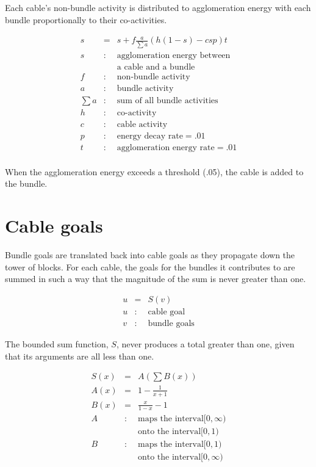 \documentclass[oneside,twocolumn]{article}
\begin{document}
Each cable's non-bundle activity is distributed to agglomeration energy with each bundle proportionally to their co-activities.

\begin{eqnarray*}
s &=& s + f  \frac{a}{\sum a} (h (1-s) - c s p) t\\ 
s &:& \mbox{agglomeration energy between}\\
&& \mbox{a cable and a bundle}\\
f &:& \mbox{non-bundle activity}\\
a &:& \mbox{bundle activity}\\
\sum a &:& \mbox{sum of all bundle activities}\\
h &:& \mbox{co-activity}\\
c &:& \mbox{cable activity}\\
p &:& \mbox{energy decay rate} = .01\\
t &:& \mbox{agglomeration energy rate} = .01\\
\end{eqnarray*}
                                      
When the agglomeration energy exceeds a threshold (.05), the cable is added to the bundle.

\section*{\color{copper} Cable goals}
        
Bundle goals are translated back into cable goals as they propagate down the tower of blocks. For each cable, the goals for the bundles it contributes to are summed in such a way that the magnitude of the sum is never greater than one.

\begin{eqnarray*}
u &=& S(v)\\ 
u &:& \mbox{cable goal}\\
v &:& \mbox{bundle goals}
\end{eqnarray*}

The bounded sum function, $S$, never produces a total greater than one, given that its arguments are all less than one.

\begin{eqnarray*}
S(x) & = & A \left (\sum B(x) \right ) \\
A(x) & = & 1 - \frac{1}{x + 1} \\ 
B(x) & = & \frac{x}{1 - x} - 1 \\
A&:& \mbox{maps the interval} [0, \infty)\\
&& \mbox{onto the interval} [0, 1) \\
B&:& \mbox{maps the interval} [0, 1)\\
&& \mbox{onto the interval} [0,\infty ) \\
\end{eqnarray*}
\end{document}
